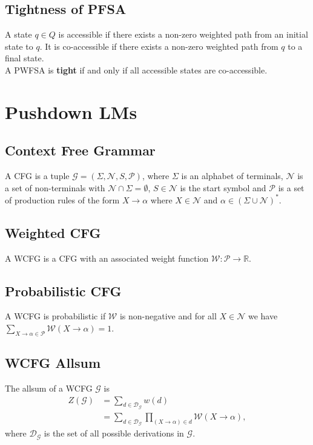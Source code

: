 \subsection*{Tightness of PFSA}
A state $q\in Q$ is accessible if there exists a non-zero weighted path from an initial state to $q$. It is co-accessible if there exists a non-zero weighted path from $q$ to a final state.\\
A PWFSA is \textbf{tight} if and only if all accessible states are co-accessible.

\section{Pushdown LMs}
\subsection*{Context Free Grammar}
A CFG is a tuple $\mathcal{G}=(\Sigma,\mathcal{N},S,\mathcal{P})$, where $\Sigma$ is an alphabet of terminals, $\mathcal{N}$ is a set of non-terminals with $\mathcal{N}\cap\Sigma= \emptyset$, $S\in\mathcal{N}$ is the start symbol and $\mathcal{P}$ is a set of production rules of the form $X\rightarrow\alpha$ where $X\in\mathcal{N}$ and $\alpha\in(\Sigma\cup\mathcal{N})^*$.

\subsection*{Weighted CFG}
A WCFG is a CFG with an associated weight function $\mathcal{W}:\mathcal{P}\rightarrow\mathbb{R}$.

\subsection*{Probabilistic CFG}
A WCFG is probabilistic if $\mathcal{W}$ is non-negative and for all $X\in\mathcal{N}$ we have $\sum_{X\rightarrow\alpha\in\mathcal{P}}\mathcal{W}(X\rightarrow\alpha)=1$.

\subsection*{WCFG Allsum}
The allsum of a WCFG $\mathcal{G}$ is
\begin{equation*}
    \begin{aligned}
        Z(\mathcal{G}) & =\sum_{d\in\mathcal{D}_\mathcal{G}}w(d) \\
                       & =\sum_{d\in\mathcal{D}_\mathcal{G}}
        \prod_{(X\rightarrow\alpha)\in d}\mathcal{W}(X\rightarrow\alpha),
    \end{aligned}
\end{equation*}
where $\mathcal{D}_\mathcal{G}$ is the set of all possible derivations in $\mathcal{G}$.

